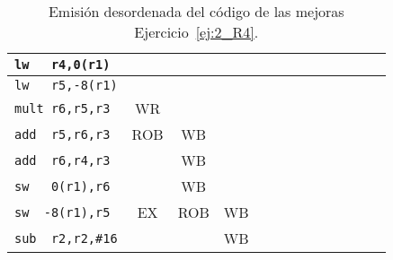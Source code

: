 \begin{ejercicio}
\begin{table}
\begin{tabular}{|l|c|c|c|c|c|c|c|c|c|c|c|c|}
            \verb|lw   r4,0(r1)|        & & & & & & &\\
            \hline            
            \verb|lw   r5,-8(r1)|       & & & & & & &\\
            \hline
            \verb|mult r6,r5,r3|        & WR & & & & & & \\
            \hline
            \verb|add  r5,r6,r3|        & ROB & WB & & & & &\\
            \hline
            \verb|add  r6,r4,r3|        & & WB & & & & & \\
            \hline            
            \verb|sw   0(r1),r6|        & & WB & & & & & \\
            \hline
            \verb|sw  -8(r1),r5|        & EX & ROB & WB & & & & \\
            \hline
            \verb|sub  r2,r2,#16|       & & & WB & & & & \\
            \hline
        \end{tabular}
        \caption{Emisión desordenada del código de las mejoras Ejercicio~\ref{ej:2_R4}.}
        \label{tab:ej3_R4_1}
    \end{table}


\end{ejercicio}
